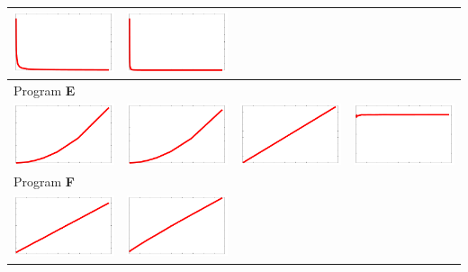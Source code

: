 \documentclass[a4paper]{article}
\begin{document}
\begin{center}
\begin{tabular}{cccc}
    \includegraphics[width=0.23\columnwidth]{flog2-n.pdf} &
    \includegraphics[width=0.23\columnwidth]{flog2-n2.pdf} \\
    \midrule
    \multicolumn{4}{l}{Program \textbf{E}} \\
    \quad
    \includegraphics[width=0.23\columnwidth]{fn2.pdf} &
    \includegraphics[width=0.23\columnwidth]{fn2-log.pdf} &
    \includegraphics[width=0.23\columnwidth]{fn2-n.pdf} &
    \includegraphics[width=0.23\columnwidth]{fn2-n2.pdf} \\
    \midrule
    \multicolumn{4}{l}{Program \textbf{F}} \\
    \quad
    \includegraphics[width=0.23\columnwidth]{flin2.pdf} &
    \includegraphics[width=0.23\columnwidth]{flin2-log.pdf} &

\end{tabular}
\end{center}
\end{document}
